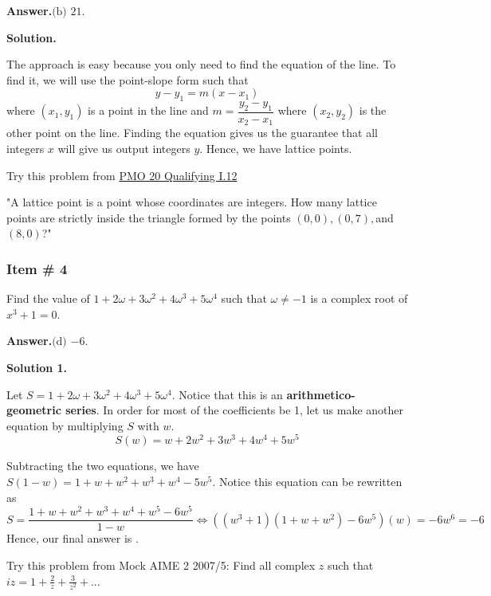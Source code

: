 \documentclass[11pt,paper=letter]{scrartcl}
\newcommand{\ans}[1]{{\sffamily \bfseries Answer.}\;\(\boxed{\text{#1}}\).}
\newcommand{\sol}{{\sffamily \bfseries Solution.}\;}
\newcommand{\soln}[1]{{\sffamily \bfseries Solution #1.}\;}
\newenvironment{rem}%
{\noindent \ignorespaces \small \sffamily  \sansmath {\bfseries \color{DarkMidnightBlue} Remark.}}%
{\ignorespacesafterend}
\newcommand{\joshbf}[1]{{\bfseries \sffamily \color{black} #1}}
\begin{document}
\ans{(b) 21}

\sol

The approach is easy because you only need to find the equation of the line. To find it, we will use the point-slope form such that $$y-y_1 = m(x-x_1)$$ where $(x_1, y_1) $ is a point in the line and $m = \dfrac{y_2 - y_1}{x_2 - x_1}$ where $(x_2, y_2)$ is the other point on the line. Finding the equation gives us the guarantee that all integers $x$ will give us output integers $y$. Hence, we have  lattice points.

\begin{mdframed}
\begin{rem}
Try this problem from \href{http://pmo.ph/wp-content/uploads/2018/08/PMO-20-Qualifying-Round-with-answers-only.pdf}{PMO 20 Qualifying I.12}

"A lattice point is a point whose coordinates are integers. How many lattice points are strictly inside the triangle formed by the points $(0, 0), (0, 7),$and $(8, 0)$?"
\end{rem}
\end{mdframed}
\subsubsection{Item \# 4}

\begin{probboxed}
Find the value of $1 + 2\omega + 3\omega^2 + 4\omega^3 + 5\omega^4$ such that $\omega \neq -1$ is a complex root of $x^3 +1 = 0$.
    
\end{probboxed}

\ans{(d) $-6$}

\soln1

Let $S = 1 + 2\omega + 3\omega^2 + 4\omega^3 + 5\omega^4$. Notice that this is an \joshbf{arithmetico-geometric series}. In order for most of the coefficients be 1, let us make another equation by multiplying $S$ with $w.$ $$S(w) = w + 2w^2 + 3w^3 + 4w^4 + 5w^5$$ 


Subtracting the two equations, we have $S(1-w) =   1+ w + w^2 + w^3 + w^4 - 5w^5 $. Notice this equation can be rewritten as $$S = \dfrac{1 + w + w^2 + w^3 + w^4 + w^5 - 6w^5}{1-w} \Leftrightarrow \left((w^3 + 1)(1 + w + w^2) - 6w^5\right)(w) = -6w^6 = -6$$ Hence, our final answer is .

\begin{mdframed}
\begin{rem}
Try this problem from Mock AIME 2 2007/5: Find all complex $z$ such that $iz = 1 + \frac{2}{z} + \frac{3}{z^2} + ...$
\end{rem}
\end{mdframed}
\end{document}
